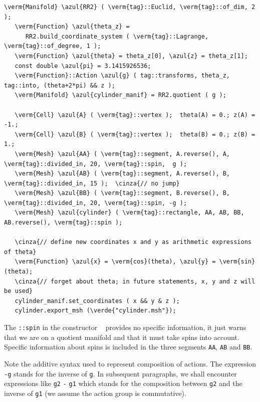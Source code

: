\begin{Verbatim}[commandchars=\\\{\},formatcom=\small\tt,frame=single,
   label=parag-\ref{\numb section 7.\numb parag 3}.cpp,rulecolor=\color{coment},
   baselinestretch=0.94,framesep=2mm                                            ]
   \verm{Manifold} \azul{RR2} ( \verm{tag}::Euclid, \verm{tag}::of_dim, 2 );
   \verm{Function} \azul{theta_z} =
      RR2.build_coordinate_system ( \verm{tag}::Lagrange, \verm{tag}::of_degree, 1 );
   \verm{Function} \azul{theta} = theta_z[0], \azul{z} = theta_z[1];
   const double \azul{pi} = 3.1415926536;
   \verm{Function}::Action \azul{g} ( tag::transforms, theta_z, tag::into, (theta+2*pi) && z );
   \verm{Manifold} \azul{cylinder_manif} = RR2.quotient ( g );

   \verm{Cell} \azul{A} ( \verm{tag}::vertex );  theta(A) = 0.; z(A) = -1.;
   \verm{Cell} \azul{B} ( \verm{tag}::vertex );  theta(B) = 0.; z(B) =  1.;
   \verm{Mesh} \azul{AA} ( \verm{tag}::segment, A.reverse(), A, \verm{tag}::divided_in, 20, \verm{tag}::spin,  g );
   \verm{Mesh} \azul{AB} ( \verm{tag}::segment, A.reverse(), B, \verm{tag}::divided_in, 15 );  \cinza{// no jump}
   \verm{Mesh} \azul{BB} ( \verm{tag}::segment, B.reverse(), B, \verm{tag}::divided_in, 20, \verm{tag}::spin, -g );
   \verm{Mesh} \azul{cylinder} ( \verm{tag}::rectangle, AA, AB, BB, AB.reverse(), \verm{tag}::spin );

   \cinza{// define new coordinates x and y as arithmetic expressions of theta}
   \verm{Function} \azul{x} = \verm{cos}(theta), \azul{y} = \verm{sin}(theta);
   \cinza{// forget about theta; in future statements, x, y and z will be used}
   cylinder_manif.set_coordinates ( x && y & z );
   cylinder.export_msh (\verde{"cylinder.msh"});
\end{Verbatim}

The {\small\tt{}::spin} in the constructor {\small\tt{} }
provides no specific information, it just warns {\maniFEM} that we are on a quotient manifold
and that it must take spins into account.
Specific information about spins is included in the three segments {\small\tt AA}, {\small\tt AB}
and {\small\tt BB}.

Note the additive syntax used to represent composition of actions.
The expression {\small\tt -g} stands for the inverse of {\small\tt g}.
In subsequent paragraphs, we shall encounter expressions like
{\small\tt g2} {\small\tt -} {\small\tt g1} which stands for the composition between
{\small\tt g2} and the inverse of {\small\tt g1} (we assume the action group is commutative).

